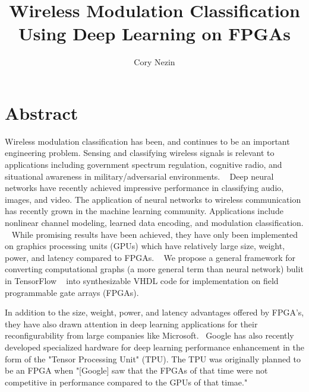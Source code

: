 \documentclass[12pt]{article}
\begin{document}
\title{Wireless Modulation Classification Using Deep Learning on FPGAs}
\author{Cory Nezin}
\maketitle
\section{Abstract}
Wireless modulation classification has been, and continues to be an important engineering problem.  
Sensing and classifying wireless signals is relevant to applications including government spectrum regulation, cognitive radio, and situational awareness in military/adversarial environments.  ~\cite{DBLP:journals/corr/RajendranCFBCGP17}  Deep neural networks have recently achieved impressive performance in classifying audio, images, and video.  The application of neural networks to wireless communication has recently grown in the machine learning community.  Applications include nonlinear channel modeling, learned data encoding, and modulation classification.  ~\cite{DBLP:journals/corr/OSheaH17}  While promising results have been achieved, they have only been implemented on graphics processing units (GPUs) which have relatively large size, weight, power, and latency compared to FPGAs. ~\cite{Nurvitadhi:2017:FBG:3020078.3021740} We propose a general framework for converting computational graphs (a more general term than neural network) bulit in TensorFlow ~\cite{DBLP:journals/corr/AbadiABBCCCDDDG16} into synthesizable VHDL code for implementation on field programmable gate arrays (FPGAs).

In addition to the size, weight, power, and latency advantages offered by FPGA's, they have also drawn attention in deep learning applications for their reconfigurability from large companies like Microsoft.~\cite{Putnam:2014:RFA:2665671.2665678} Google has also recently developed specialized hardware for deep learning performance enhancement in the form of the "Tensor Processing Unit" (TPU).  The TPU was originally planned to be an FPGA when "[Google] saw that the FPGAs of that time were not competitive in performance compared to the GPUs of that timae."~\cite{DBLP:journals/corr/JouppiYPPABBBBB17}


{}

\end{document}
